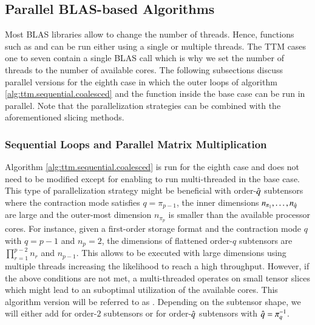 



 
\subsection{Parallel BLAS-based Algorithms}
\label{subsec:parallel.multi-loops}
Most BLAS libraries allow to change the number of threads.
Hence, functions such as  and  can be run either using a single or multiple threads.
The TTM cases one to seven contain a single BLAS call which is why we set the number of threads to the number of available cores.
The following subsections discuss parallel versions for the eighth case in which the outer loops of algorithm \ref{alg:ttm.sequential.coalesced} and the  function inside the base case can be run in parallel.
Note that the parallelization strategies can be combined with the aforementioned slicing methods.

\subsubsection{Sequential Loops and Parallel Matrix Multiplication}
Algorithm \ref{alg:ttm.sequential.coalesced} is run for the eighth case and does not need to be modified except for  enabling  to run multi-threaded in the base case.
This type of parallelization strategy might be beneficial with order-$\hat{q}$ subtensors where the contraction mode satisfies $q = \pi_{p-1}$, the inner dimensions $n_{\pi_1},\dots,n_{\hat{q}}$ are large and the outer-most dimension $n_{\pi_{p}}$ is smaller than the available processor cores.
For instance, given a first-order storage format and the contraction mode $q$ with $q=p-1$ and $n_p=2$, the dimensions of flattened order-$q$ subtensors are $\prod_{r=1}^{p-2}n_r$ and $n_{p-1}$.
This allows  to be executed with large dimensions using multiple threads increasing the likelihood to reach a high throughput.
However, if the above conditions are not met, a multi-threaded  operates on small tensor slices which might lead to an suboptimal utilization of the available cores.
This algorithm version will be referred to as .
Depending on the subtensor shape, we will either add  for order-$2$ subtensors or  for order-$\hat{q}$ subtensors with $\hat{q} = \pi^{-1}_q$.

